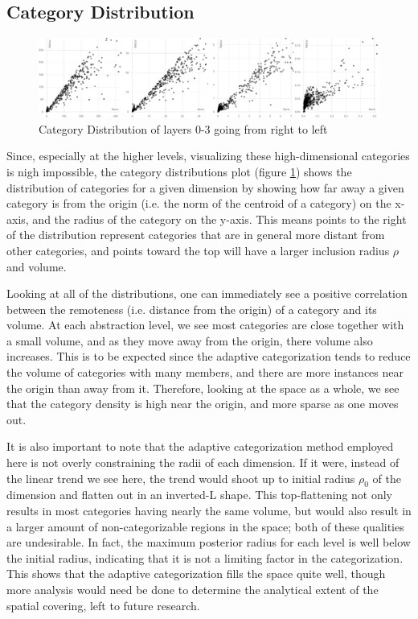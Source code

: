 \subsection{Category Distribution}
\label{section:category-distribution}

\begin{figure}
  \centering
  \includegraphics[width=\linewidth]{fig/category-distribution.pdf}
  \caption{Category Distribution of layers 0-3 going from right to left}
  \label{figure:category-distribution}
\end{figure}

 Since, especially at the higher levels, visualizing these high-dimensional categories is nigh impossible, the category distributions plot (figure \ref{figure:category-distribution}) shows the distribution of categories for a given dimension by showing how far away a given category is from the origin (i.e. the norm of the centroid of a category) on the x-axis, and the radius of the category on the y-axis.  This means points to the right of the distribution represent categories that are in general more distant from other categories, and points toward the top will have a larger inclusion radius $\rho$ and volume.

Looking at all of the distributions, one can immediately see a positive correlation between the remoteness (i.e. distance from the origin) of a category and its volume.  At each abstraction level, we see most categories are close together with a small volume, and as they move away from the origin, there volume also increases.  This is to be expected since the adaptive categorization tends to reduce the volume of categories with many members, and there are more instances near the origin than away from it.  Therefore, looking at the space as a whole, we see that the category density is high near the origin, and more sparse as one moves out.

It is also important to note that the adaptive categorization method employed here is not overly constraining the radii of each dimension.  If it were, instead of the linear trend we see here, the trend would shoot up to initial radius $\rho_0$ of the dimension and flatten out in an inverted-L shape.  This top-flattening not only results in most categories having nearly the same volume, but would also result in a larger amount of non-categorizable regions in the space; both of these qualities are undesirable.  In fact, the maximum posterior radius for each level is well below the initial radius, indicating that it is not a limiting factor in the categorization.  This shows that the adaptive categorization fills the space quite well, though more analysis would need be done to determine the analytical extent of the spatial covering, left to future research.

